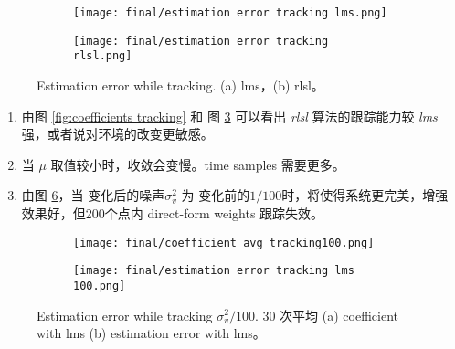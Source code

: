 \documentclass[11pt]{article}
\begin{document}
\begin{figure}[!htbp]
    \centering
    \begin{subfigure}[b]{0.49\textwidth}
      \texttt{[image: final/estimation error tracking lms.png]}
      \caption{}
      \label{fig:error tracking lms}
    \end{subfigure}%
    \hfill  %
    \begin{subfigure}[b]{0.49\textwidth}
      \texttt{[image: final/estimation error tracking rlsl.png]}
      \caption{}
      \label{fig:error tracking rlsl}
    \end{subfigure}
    \caption{Estimation error while tracking. (a) lms，(b) rlsl。}
    \label{fig:estimation error tracking}
\end{figure}

\begin{enumerate}
    \item 由图 \ref{fig:coefficients tracking} 和 图 \ref{fig:estimation error tracking} 可以看出 {\color{blue} \emph{rlsl}} 算法的跟踪能力较 {\color{blue} \emph{lms}} 强，或者说对环境的改变更敏感。

    \item 当 $\mu$ 取值较小时，收敛会变慢。time samples 需要更多。

    \item 由图 \ref{fig:error tracking 100}，当 变化后的噪声$\sigma_v^2$ 为 变化前的$1/100$时，将使得系统更完美，增强效果好，但200个点内 direct-form weights 跟踪失效。
\end{enumerate}

\begin{figure}[!htbp]
    \centering
    \begin{subfigure}[b]{0.49\textwidth}
      \texttt{[image: final/coefficient avg tracking100.png]}
      \caption{}
      \label{fig:coefficient tracking lms 100}
    \end{subfigure}%
    \hfill  %
    \begin{subfigure}[b]{0.49\textwidth}
      \texttt{[image: final/estimation error tracking lms 100.png]}
      \caption{}
      \label{fig:error tracking lms 100}
    \end{subfigure}
    \caption{Estimation error while tracking $\sigma_v^2/100$. 30 次平均 (a) coefficient with lms (b) estimation error with lms。}
    \label{fig:error tracking 100}
\end{figure}
\end{document}

